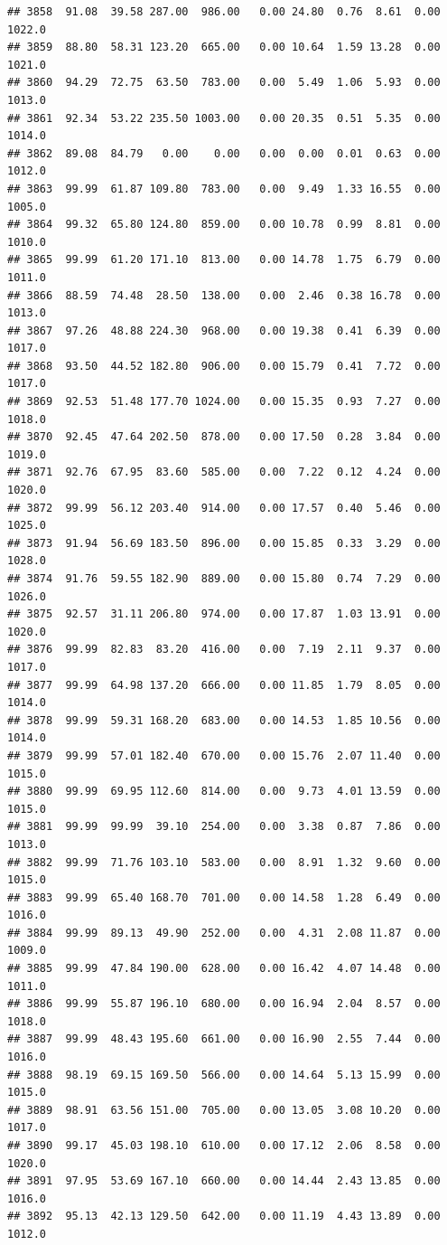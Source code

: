 \documentclass{article}\usepackage{graphicx, color}
\makeatletter
\newenvironment{kframe}{%
 \def\at@end@of@kframe{}%
 \ifinner\ifhmode%
  \def\at@end@of@kframe{\end{minipage}}%
  \begin{minipage}{\columnwidth}%
 \fi\fi%
 \def\FrameCommand##1{\hskip\@totalleftmargin \hskip-\fboxsep
 \colorbox{shadecolor}{##1}\hskip-\fboxsep
     \hskip-\linewidth \hskip-\@totalleftmargin \hskip\columnwidth}%
 \MakeFramed {\advance\hsize-\width
   \@totalleftmargin\z@ \linewidth\hsize
   \@setminipage}}%
 {\par\unskip\endMakeFramed%
 \at@end@of@kframe}
\newenvironment{knitrout}{}{} %
\makeatother
\begin{document}
\begin{knitrout}
\begin{kframe}
\begin{verbatim}
## 3858  91.08  39.58 287.00  986.00   0.00 24.80  0.76  8.61  0.00 1022.0
## 3859  88.80  58.31 123.20  665.00   0.00 10.64  1.59 13.28  0.00 1021.0
## 3860  94.29  72.75  63.50  783.00   0.00  5.49  1.06  5.93  0.00 1013.0
## 3861  92.34  53.22 235.50 1003.00   0.00 20.35  0.51  5.35  0.00 1014.0
## 3862  89.08  84.79   0.00    0.00   0.00  0.00  0.01  0.63  0.00 1012.0
## 3863  99.99  61.87 109.80  783.00   0.00  9.49  1.33 16.55  0.00 1005.0
## 3864  99.32  65.80 124.80  859.00   0.00 10.78  0.99  8.81  0.00 1010.0
## 3865  99.99  61.20 171.10  813.00   0.00 14.78  1.75  6.79  0.00 1011.0
## 3866  88.59  74.48  28.50  138.00   0.00  2.46  0.38 16.78  0.00 1013.0
## 3867  97.26  48.88 224.30  968.00   0.00 19.38  0.41  6.39  0.00 1017.0
## 3868  93.50  44.52 182.80  906.00   0.00 15.79  0.41  7.72  0.00 1017.0
## 3869  92.53  51.48 177.70 1024.00   0.00 15.35  0.93  7.27  0.00 1018.0
## 3870  92.45  47.64 202.50  878.00   0.00 17.50  0.28  3.84  0.00 1019.0
## 3871  92.76  67.95  83.60  585.00   0.00  7.22  0.12  4.24  0.00 1020.0
## 3872  99.99  56.12 203.40  914.00   0.00 17.57  0.40  5.46  0.00 1025.0
## 3873  91.94  56.69 183.50  896.00   0.00 15.85  0.33  3.29  0.00 1028.0
## 3874  91.76  59.55 182.90  889.00   0.00 15.80  0.74  7.29  0.00 1026.0
## 3875  92.57  31.11 206.80  974.00   0.00 17.87  1.03 13.91  0.00 1020.0
## 3876  99.99  82.83  83.20  416.00   0.00  7.19  2.11  9.37  0.00 1017.0
## 3877  99.99  64.98 137.20  666.00   0.00 11.85  1.79  8.05  0.00 1014.0
## 3878  99.99  59.31 168.20  683.00   0.00 14.53  1.85 10.56  0.00 1014.0
## 3879  99.99  57.01 182.40  670.00   0.00 15.76  2.07 11.40  0.00 1015.0
## 3880  99.99  69.95 112.60  814.00   0.00  9.73  4.01 13.59  0.00 1015.0
## 3881  99.99  99.99  39.10  254.00   0.00  3.38  0.87  7.86  0.00 1013.0
## 3882  99.99  71.76 103.10  583.00   0.00  8.91  1.32  9.60  0.00 1015.0
## 3883  99.99  65.40 168.70  701.00   0.00 14.58  1.28  6.49  0.00 1016.0
## 3884  99.99  89.13  49.90  252.00   0.00  4.31  2.08 11.87  0.00 1009.0
## 3885  99.99  47.84 190.00  628.00   0.00 16.42  4.07 14.48  0.00 1011.0
## 3886  99.99  55.87 196.10  680.00   0.00 16.94  2.04  8.57  0.00 1018.0
## 3887  99.99  48.43 195.60  661.00   0.00 16.90  2.55  7.44  0.00 1016.0
## 3888  98.19  69.15 169.50  566.00   0.00 14.64  5.13 15.99  0.00 1015.0
## 3889  98.91  63.56 151.00  705.00   0.00 13.05  3.08 10.20  0.00 1017.0
## 3890  99.17  45.03 198.10  610.00   0.00 17.12  2.06  8.58  0.00 1020.0
## 3891  97.95  53.69 167.10  660.00   0.00 14.44  2.43 13.85  0.00 1016.0
## 3892  95.13  42.13 129.50  642.00   0.00 11.19  4.43 13.89  0.00 1012.0

\end{verbatim}
\end{kframe}
\end{knitrout}
\end{document}
